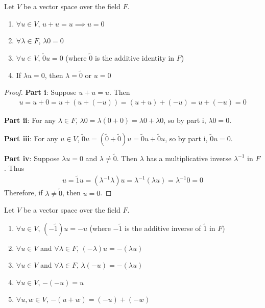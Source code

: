 \begin{theorem}\label{thm:zeros-identity}
    Let $V$ be a vector space over the field $F$.
    \begin{enumerate}[label=\roman*.]
        \item $\forall u \in V$, $u + u = u \implies u = 0$
        \item $\forall \lambda \in F$, $\lambda 0 = 0$
        \item $\forall u \in V$, $\tilde{0}u = 0$ (where $\tilde{0}$ is the additive identity in $F$)
        \item If $\lambda u = 0$, then $\lambda = \tilde{0}$ or $u = 0$
    \end{enumerate}
\end{theorem}

\begin{proof}
    \textbf{Part i}: Suppose $u + u = u$. Then
    \begin{align*}
        u = u + 0 = u + (u + (-u)) = (u + u) + (-u) = u + (-u) = 0
    \end{align*}
    
    \textbf{Part ii}: For any $\lambda \in F$, $\lambda 0 = \lambda(0 + 0) = \lambda 0 + \lambda 0$, so by part i, $\lambda 0 = 0$.
    
    \textbf{Part iii}: For any $u \in V$, $\tilde{0}u = (\tilde{0} + \tilde{0})u = \tilde{0}u + \tilde{0}u$, so by part i, $\tilde{0}u = 0$.
    
    \textbf{Part iv}: Suppose $\lambda u = 0$ and $\lambda \neq \tilde{0}$. Then $\lambda$ has a multiplicative inverse $\lambda^{-1}$ in $F$. Thus
    \begin{align*}
        u = \tilde{1}u = (\lambda^{-1}\lambda)u = \lambda^{-1}(\lambda u) = \lambda^{-1}0 = 0
    \end{align*}
    Therefore, if $\lambda \neq \tilde{0}$, then $u = 0$.
\end{proof}

\begin{theorem}\label{thm:negation}
    Let $V$ be a vector space over the field $F$.
    \begin{enumerate}[label=\roman*.]
        \item $\forall u \in V$, $(-\tilde{1})u = -u$ (where $-\tilde{1}$ is the additive inverse of $\tilde{1}$ in $F$)
        \item $\forall u \in V$ and $\forall \lambda \in F$, $(-\lambda)u = -(\lambda u)$
        \item $\forall u \in V$ and $\forall \lambda \in F$, $\lambda(-u) = -(\lambda u)$
        \item $\forall u \in V$, $-(-u) = u$
        \item $\forall u, w \in V$, $-(u + w) = (-u) + (-w)$
    \end{enumerate}
\end{theorem}

